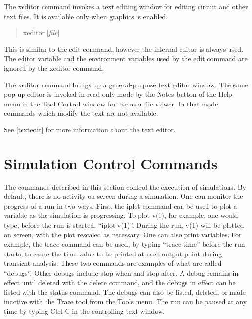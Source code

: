 The {\cb xeditor} command invokes a text editing window for editing
circuit and other text files.  It is available only when graphics is
enabled.
\begin{quote}\vt
xeditor [{\it file\/}]
\end{quote}
This is similar to the {\cb edit} command, however the internal editor
is always used.  The {\et editor} variable and the environment
variables used by the {\cb edit} command are ignored by the {\cb
xeditor} command.

The {\cb xeditor} command brings up a general-purpose text editor
window.  The same pop-up editor is invoked in read-only mode by the
{\cb Notes} button of the {\cb Help} menu in the {\cb Tool Control}
window for use as a file viewer.  In that mode, commands which modify
the text are not available.

See \ref{textedit} for more information about the text editor.


\section{Simulation Control Commands}
\label{simcmds}


The commands described in this section control the execution of
{\WRspice} simulations.  By default, there is no activity on screen
during a simulation.  One can monitor the progress of a run in two
ways.  First, the {\cb iplot} command can be used to plot a variable
as the simulation is progressing.  To plot {\vt v(1)}, for example,
one would type, before the run is started, ``{\vt iplot v(1)}''. 
During the run, {\vt v(1)} will be plotted on screen, with the plot
rescaled as necessary.  One can also print variables.  For example,
the {\cb trace} command can be used, by
typing ``{\vt trace time}'' before the run starts, to cause the time
value to be printed at each output point during transient analysis. 
These two commands are examples of what are called ``debugs''.  Other
debugs include {\vt stop when} and {\vt stop after}.  A debug remains
in effect until deleted with the {\cb delete} command, and the debugs
in effect can be listed with the {\cb status} command.  The debugs can
also be listed, deleted, or made inactive with the {\cb Trace} tool
from the {\cb Tools} menu.  The run can be paused at any time by
typing {\kb Ctrl-C} in the controlling text window.


